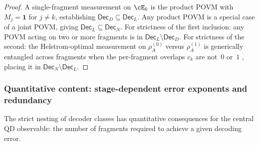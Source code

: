 \begin{proof}
A single-fragment measurement on $\cE_k$ is the product POVM with
$M_j=\mathbf{1}$ for $j\neq k$, establishing
$\mathsf{Dec}_D\subseteq\mathsf{Dec}_L$.
Any product POVM is a special case of a joint POVM, giving
$\mathsf{Dec}_L\subseteq\mathsf{Dec}_N$.
For strictness of the first inclusion: any POVM acting on two or more
fragments is in $\mathsf{Dec}_L\setminus\mathsf{Dec}_D$.
For strictness of the second: the Helstrom-optimal measurement on
$\rho_A^{(0)}$ versus $\rho_A^{(1)}$ is generically entangled across
fragments when the per-fragment overlaps $c_k$ are not~$0$ or~$1$
\citep{Helstrom1976}, placing it in
$\mathsf{Dec}_N\setminus\mathsf{Dec}_L$.
\end{proof}


\subsubsection{Quantitative content: stage-dependent error exponents and redundancy}

The strict nesting of decoder classes has quantitative consequences for
the central QD observable: the number of fragments required to achieve a
given decoding error.

